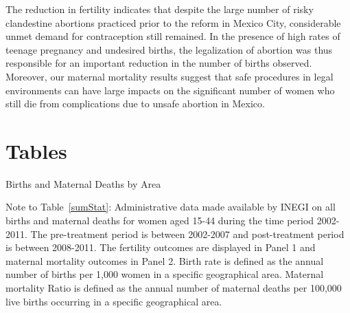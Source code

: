 \documentclass[a4paper, 11pt]{article}
\begin{document}
\begin{spacing}{2}
The reduction in fertility indicates that despite the large number of risky clandestine abortions practiced prior to the reform in Mexico City, considerable unmet demand for contraception still remained. In the presence of high rates of teenage pregnancy and undesired births, the legalization of abortion was thus responsible for an important reduction in the number of births observed. Moreover, our maternal mortality results suggest that safe procedures in legal environments can have large impacts on the significant number of women who still die from complications due to unsafe abortion in Mexico. 
 
\newpage

\section{Tables} 
 
\begin{table}\caption{Births and Maternal Deaths by Area}\label{sumStat}
\begin{threeparttable}

\begin{tablenotes}
\item Note to Table~\ref{sumStat}: Administrative data made available by INEGI on all births and maternal deaths for women aged 15-44 during the time period 2002-2011. The pre-treatment period is between 2002-2007 and post-treatment period is between 2008-2011. The fertility outcomes are displayed in Panel 1 and maternal mortality outcomes in Panel 2. Birth rate is defined as the annual number of births per 1,000 women in a specific geographical area. Maternal mortality Ratio is defined as the annual number of maternal deaths per 100,000 live births occurring in a specific geographical area. 
\end{tablenotes}
\end{threeparttable}

\end{table}

 


\end{spacing}
\end{document}
